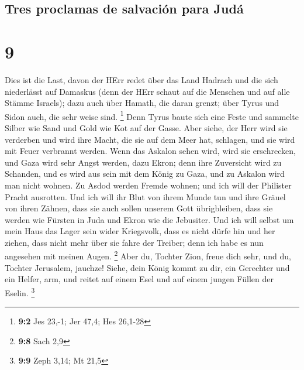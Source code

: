 \hypertarget{tres-proclamas-de-salvaciuxf3n-para-juduxe1}{%
\subsection{Tres proclamas de salvación para
Judá}\label{tres-proclamas-de-salvaciuxf3n-para-juduxe1}}

\hypertarget{section-8}{%
\section{9}\label{section-8}}

 Dies ist die Last, davon der HErr redet über das Land
Hadrach und die sich niederlässt auf Damaskus (denn der HErr schaut auf
die Menschen und auf alle Stämme Israels);  dazu auch über
Hamath, die daran grenzt; über Tyrus und Sidon auch, die sehr weise
sind. \footnote{\textbf{9:2} Jes 23,-1; Jer 47,4; Hes 26,1-28}
 Denn Tyrus baute sich eine Feste und sammelte Silber wie
Sand und Gold wie Kot auf der Gasse.  Aber siehe, der Herr
wird sie verderben und wird ihre Macht, die sie auf dem Meer hat,
schlagen, und sie wird mit Feuer verbrannt werden.  Wenn
das Askalon sehen wird, wird sie erschrecken, und Gaza wird sehr Angst
werden, dazu Ekron; denn ihre Zuversicht wird zu Schanden, und es wird
aus sein mit dem König zu Gaza, und zu Askalon wird man nicht wohnen.
 Zu Asdod werden Fremde wohnen; und ich will der Philister
Pracht ausrotten.  Und ich will ihr Blut von ihrem Munde
tun und ihre Gräuel von ihren Zähnen, dass sie auch sollen unserem Gott
übrigbleiben, dass sie werden wie Fürsten in Juda und Ekron wie die
Jebusiter.  Und ich will selbst um mein Haus das Lager
sein wider Kriegsvolk, dass es nicht dürfe hin und her ziehen, dass
nicht mehr über sie fahre der Treiber; denn ich habe es nun angesehen
mit meinen Augen. \footnote{\textbf{9:8} Sach 2,9}  Aber
du, Tochter Zion, freue dich sehr, und du, Tochter Jerusalem, jauchze!
Siehe, dein König kommt zu dir, ein Gerechter und ein Helfer, arm, und
reitet auf einem Esel und auf einem jungen Füllen der Eselin.
\footnote{\textbf{9:9} Zeph 3,14; Mt 21,5}

